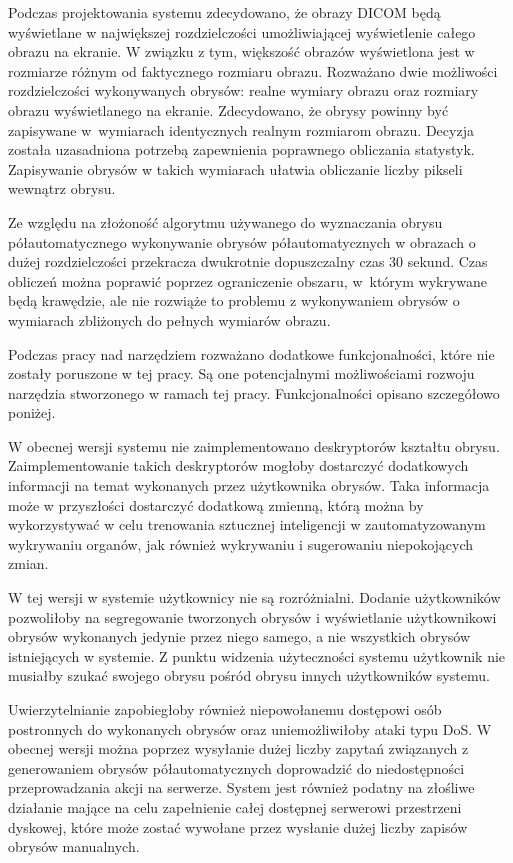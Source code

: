 \documentclass[a4paper,11pt,twoside,openright]{report}
\theoremstyle{definition}
\begin{document}
Podczas projektowania systemu zdecydowano, że obrazy DICOM będą wyświetlane w
największej rozdzielczości umożliwiającej wyświetlenie całego obrazu na ekranie.
W związku z tym, większość obrazów wyświetlona jest w rozmiarze różnym od
faktycznego rozmiaru obrazu. Rozważano dwie możliwości rozdzielczości wykonywanych
obrysów: realne wymiary obrazu oraz rozmiary obrazu wyświetlanego na ekranie.
Zdecydowano, że obrysy powinny być zapisywane w~wymiarach identycznych realnym
rozmiarom obrazu. Decyzja została uzasadniona potrzebą zapewnienia poprawnego
obliczania statystyk. Zapisywanie obrysów w takich wymiarach ułatwia obliczanie
liczby pikseli wewnątrz obrysu.

Ze względu na złożoność algorytmu używanego do wyznaczania obrysu półautomatycznego
wykonywanie obrysów półautomatycznych w obrazach o dużej rozdzielczości przekracza
dwukrotnie dopuszczalny czas 30 sekund. Czas
obliczeń można poprawić poprzez ograniczenie obszaru, w~którym wykrywane będą
krawędzie, ale nie rozwiąże to problemu z wykonywaniem obrysów o wymiarach
zbliżonych do pełnych wymiarów obrazu.

Podczas pracy nad narzędziem rozważano dodatkowe funkcjonalności, które nie zostały
poruszone w tej pracy. Są one potencjalnymi możliwościami rozwoju narzędzia
stworzonego w ramach tej pracy. Funkcjonalności opisano szczegółowo poniżej.

W obecnej wersji systemu nie zaimplementowano deskryptorów kształtu obrysu.
Zaimplementowanie takich deskryptorów mogłoby dostarczyć dodatkowych informacji
na temat wykonanych przez użytkownika obrysów. Taka informacja może w przyszłości
dostarczyć dodatkową zmienną, którą można by wykorzystywać w celu trenowania
sztucznej inteligencji w zautomatyzowanym wykrywaniu organów, jak również wykrywaniu
i sugerowaniu niepokojących zmian.

W tej wersji w systemie użytkownicy nie są rozróżnialni. Dodanie użytkowników
pozwoliłoby na segregowanie tworzonych obrysów i wyświetlanie użytkownikowi
obrysów wykonanych jedynie przez niego samego, a nie wszystkich obrysów istniejących
w systemie. Z punktu widzenia użyteczności systemu użytkownik nie musiałby szukać
swojego obrysu pośród obrysu innych użytkowników systemu.

Uwierzytelnianie zapobiegłoby również niepowołanemu dostępowi osób postronnych
do wykonanych obrysów oraz uniemożliwiłoby ataki typu DoS. W obecnej wersji można
poprzez wysyłanie dużej liczby zapytań związanych z generowaniem obrysów półautomatycznych
doprowadzić do niedostępności przeprowadzania akcji na serwerze. System jest również
podatny na złośliwe działanie mające na celu zapełnienie całej dostępnej serwerowi
przestrzeni dyskowej, które może zostać wywołane przez wysłanie dużej liczby
zapisów obrysów manualnych.
\end{document}
